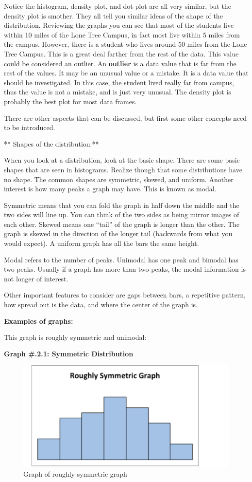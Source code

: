 \documentclass[
]{book}
\begin{document}
Notice the histogram, density plot, and dot plot are all very similar, but the density plot is smother. They all tell you similar ideas of the shape of the distribution. Reviewing the graphs you can see that most of the students live within 10 miles of the Lone Tree Campus, in fact most live within 5 miles from the campus. However, there is a student who lives around 50 miles from the Lone Tree Campus. This is a great deal farther from the rest of the data. This value could be considered an outlier. An \textbf{outlier} is a data value that is far from the rest of the values. It may be an unusual value or a mistake. It is a data value that should be investigated. In this case, the student lived really far from campus, thus the value is not a mistake, and is just very unusual. The density plot is probably the best plot for most data frames.

There are other aspects that can be discussed, but first some other concepts need to be introduced.

** Shapes of the distribution:**

When you look at a distribution, look at the basic shape. There are some basic shapes that are seen in histograms. Realize though that some distributions have no shape. The common shapes are symmetric, skewed,
and uniform. Another interest is how many peaks a graph may have. This is known as modal.

Symmetric means that you can fold the graph in half down the middle and the two sides will line up. You can think of the two sides as being mirror images of each other. Skewed means one ``tail'' of the graph is
longer than the other. The graph is skewed in the direction of the longer tail (backwards from what you would expect). A uniform graph has all the bars the same height.

Modal refers to the number of peaks. Unimodal has one peak and bimodal has two peaks. Usually if a graph has more than two peaks, the modal information is not longer of interest.

Other important features to consider are gaps between bars, a repetitive pattern, how spread out is the data, and where the center of the graph is.

\textbf{Examples of graphs:}

This graph is roughly symmetric and unimodal:

\textbf{Graph \#.2.1: Symmetric Distribution}

\begin{figure}
\centering
\includegraphics{symmetric.png}
\caption{Graph of roughly symmetric graph}
\end{figure}
\end{document}
